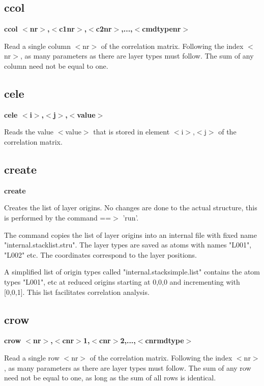 \subsection*{ccol}
{\bf ccol $ <$nr$> $,$ <$c1nr$> $,$ <$c2nr$> $,...,$ <$cmdtypenr$> $ \par }
\par
\vspace{3pt}
Read a single column $ <$nr$> $ of the correlation matrix. Following the 
index $ <$nr$> $, as many parameters as there are layer types must follow. 
The sum of any column need not be equal to one. 
\subsection*{cele}
{\bf cele $ <$i$> $,$ <$j$> $,$ <$value$> $ \par }
\par
\vspace{3pt}
Reads the value $ <$value$> $ that is stored in element $ <$i$> $,$ <$j$> $ of the 
correlation matrix. 
\subsection*{create}
{\bf create \par }
\par
\vspace{3pt}
Creates the list of layer origins. No changes are done to the 
actual structure, this is performed by the command ==$> $ 'run'. 
\par
The command copies the list of layer origins into an internal 
file with fixed name "internal.stacklist.stru". The layer types 
are saved as atoms with names "L001", "L002" etc. The coordinates 
correspond to the layer positions. 
\par
A simplified list of origin types called 
"internal.stacksimple.list" 
contains the atom types "L001", etc at reduced origins 
starting at 0,0,0 and incrementing with [0,0,1]. This 
list facilitates correlation analysis. 
\subsection*{crow}
{\bf crow $ <$nr$> $,$ <$cnr$> $1,$ <$cnr$> $2,...,$ <$cnrmdtype$> $ \par }
\par
\vspace{3pt}
Read a single row $ <$nr$> $ of the correlation matrix. Following the 
index $ <$nr$> $, as many parameters as there are layer types must follow. 
The sum of any row need not be equal to one, as long as the sum of all 
rows is identical. 
